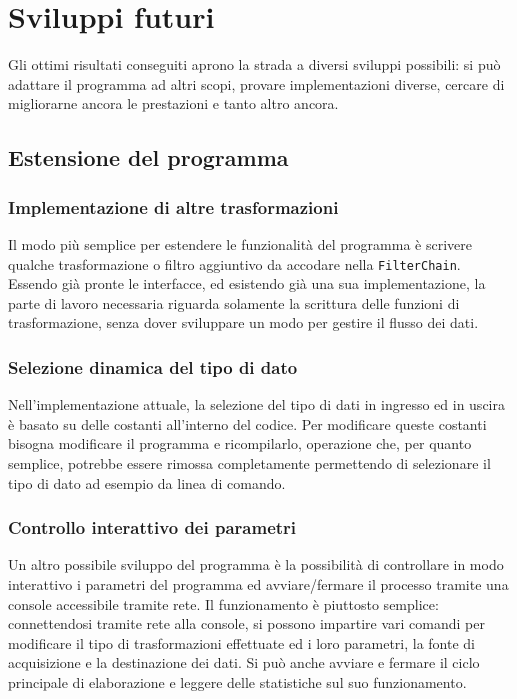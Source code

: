 \section{Sviluppi futuri}
Gli ottimi risultati conseguiti aprono la strada a diversi sviluppi possibili:
si può adattare il programma ad altri scopi, provare implementazioni diverse,
cercare di migliorarne ancora le prestazioni e tanto altro ancora.
\subsection{Estensione del programma}

\subsubsection{Implementazione di altre trasformazioni}
Il modo pi\`u semplice per estendere le funzionalit\`a del programma \`e
scrivere qualche trasformazione o filtro aggiuntivo da accodare nella
\texttt{FilterChain}. Essendo gi\`a pronte le interfacce, ed esistendo gi\`a una
sua implementazione, la parte di lavoro necessaria riguarda solamente la
scrittura delle funzioni di trasformazione, senza dover sviluppare un modo per
gestire il flusso dei dati.

\subsubsection{Selezione dinamica del tipo di dato}
\label{dyn_dtype}
Nell'implementazione attuale, la selezione del tipo di dati in ingresso ed in
uscira \`e basato su delle costanti all'interno del codice. Per modificare
queste costanti bisogna modificare il programma e ricompilarlo, operazione che,
per quanto semplice, potrebbe essere rimossa completamente permettendo di
selezionare il tipo di dato ad esempio da linea di comando.

\subsubsection{Controllo interattivo dei parametri}
Un altro possibile sviluppo del programma \`e la possibilit\`a di controllare in
modo interattivo i parametri del programma ed avviare/fermare il processo
tramite una console accessibile tramite rete. Il funzionamento \`e piuttosto
semplice: connettendosi tramite rete alla console, si possono impartire vari
comandi per modificare il tipo di trasformazioni effettuate ed i loro parametri,
la fonte di acquisizione e la destinazione dei dati. Si può anche avviare e
fermare il ciclo principale di elaborazione e leggere delle statistiche sul suo
funzionamento.

